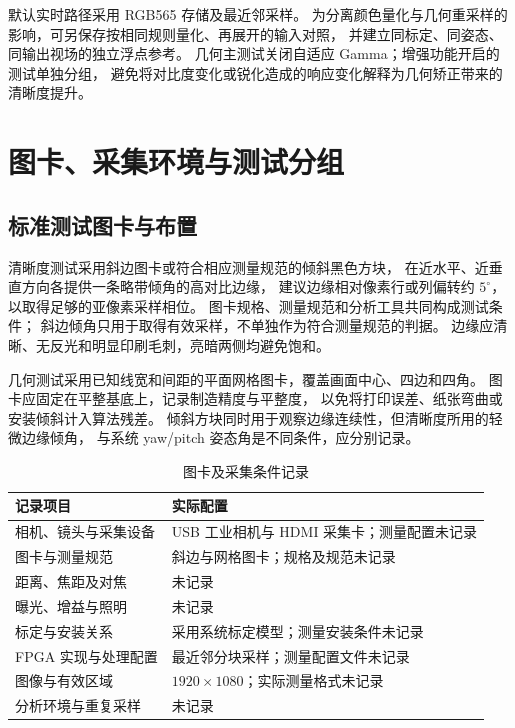 默认实时路径采用 RGB565 存储及最近邻采样。
为分离颜色量化与几何重采样的影响，可另保存按相同规则量化、再展开的输入对照，
并建立同标定、同姿态、同输出视场的独立浮点参考。
几何主测试关闭自适应 Gamma；增强功能开启的测试单独分组，
避免将对比度变化或锐化造成的响应变化解释为几何矫正带来的清晰度提升。

\section{图卡、采集环境与测试分组}
\subsection{标准测试图卡与布置}
清晰度测试采用斜边图卡或符合相应测量规范的倾斜黑色方块，
在近水平、近垂直方向各提供一条略带倾角的高对比边缘，
建议边缘相对像素行或列偏转约 $5^\circ$，以取得足够的亚像素采样相位。
图卡规格、测量规范和分析工具共同构成测试条件；
斜边倾角只用于取得有效采样，不单独作为符合测量规范的判据。
边缘应清晰、无反光和明显印刷毛刺，亮暗两侧均避免饱和。

几何测试采用已知线宽和间距的平面网格图卡，覆盖画面中心、四边和四角。
图卡应固定在平整基底上，记录制造精度与平整度，
以免将打印误差、纸张弯曲或安装倾斜计入算法残差。
倾斜方块同时用于观察边缘连续性，但清晰度所用的轻微边缘倾角，
与系统 yaw/pitch 姿态角是不同条件，应分别记录。

\begin{table}[htbp]
\centering\small
\caption{图卡及采集条件记录}\label{tab:quality-setup}
\begin{tabularx}{\textwidth}{>{\raggedright\arraybackslash}p{3.5cm}Y}
\toprule
记录项目 & 实际配置 \\
\midrule
相机、镜头与采集设备 & USB 工业相机与 HDMI 采集卡；测量配置未记录 \\
图卡与测量规范 & 斜边与网格图卡；规格及规范未记录 \\
距离、焦距及对焦 & 未记录 \\
曝光、增益与照明 & 未记录 \\
标定与安装关系 & 采用系统标定模型；测量安装条件未记录 \\
FPGA 实现与处理配置 & 最近邻分块采样；测量配置文件未记录 \\
图像与有效区域 & $1920\times1080$；实际测量格式未记录 \\
分析环境与重复采样 & 未记录 \\
\bottomrule
\end{tabularx}
\end{table}


